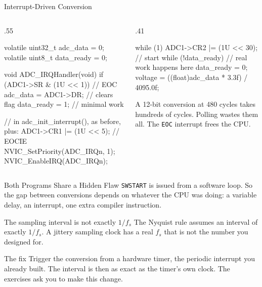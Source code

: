 \documentclass[9pt,aspectratio=169,xcolor=table]{beamer}
\begin{document}
\begin{frame}[fragile]{Interrupt-Driven Conversion}
    \begin{columns}[T]
    \begin{column}{.55\textwidth}
\begin{cc}[basicstyle=\ttfamily\scriptsize]
volatile uint32_t adc_data = 0;
volatile uint8_t  data_ready = 0;

void ADC_IRQHandler(void) {
    if (ADC1->SR & (1U << 1)) {  // EOC
        adc_data   = ADC1->DR;   // clears flag
        data_ready = 1;          // minimal work
    }
}

// in adc_init_interrupt(), as before, plus:
ADC1->CR1 |= (1U << 5);   // EOCIE
NVIC_SetPriority(ADC_IRQn, 1);
NVIC_EnableIRQ(ADC_IRQn);
\end{cc}
    \end{column}
    \begin{column}{.41\textwidth}
\begin{cc}[basicstyle=\ttfamily\scriptsize]
while (1) {
    ADC1->CR2 |= (1U << 30); // start
    while (!data_ready) {
        // real work happens here
    }
    data_ready = 0;
    voltage = ((float)adc_data
               * 3.3f) / 4095.0f;
}
\end{cc}
        \vspace{2mm}
        {\small A 12-bit conversion at 480 cycles takes hundreds of cycles. Polling wastes them all. The \texttt{EOC} interrupt frees the CPU.}
    \end{column}
    \end{columns}
\end{frame}

\begin{frame}{Both Programs Share a Hidden Flaw}
    \leavevmode
    \texttt{SWSTART} is issued from a software loop. So the gap between conversions depends on whatever the CPU was doing: a variable delay, an interrupt, one extra compiler instruction.

    \vspace{3mm}
    \begin{block}{The sampling interval is not exactly $1/f_s$}
        The Nyquist rule assumes an interval of exactly $1/f_s$. A jittery sampling clock has a real $f_s$ that is \alert{not the number you designed for}.
    \end{block}

    \vspace{3mm}
    \begin{block}{The fix}
        Trigger the conversion from a \alert{hardware timer}, the periodic interrupt you already built. The interval is then as exact as the timer's own clock. The exercises ask you to make this change.
    \end{block}
\end{frame}
\end{document}
